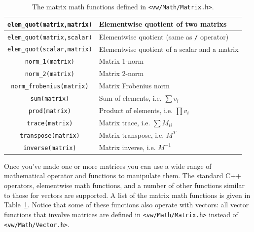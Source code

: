 \begin{table}[t!]
\begin{centering}
\begin{tabular}{|c|l|}
\verb#elem_quot(matrix,matrix)# & Elementwise quotient of two matrixs \\ \hline
\verb#elem_quot(matrix,scalar)# & Elementwise quotient (same as \verb#/# operator) \\ \hline
\verb#elem_quot(scalar,matrix)# & Elementwise quotient of a scalar and a matrix \\ \hline
\hline
\verb#norm_1(matrix)# & Matrix 1-norm \\ \hline
\verb#norm_2(matrix)# & Matrix 2-norm \\ \hline
\verb#norm_frobenius(matrix)# & Matrix Frobenius norm \\ \hline
\verb#sum(matrix)# & Sum of elements, i.e. $\sum v_i$ \\ \hline
\verb#prod(matrix)# & Product of elements, i.e. $\prod v_i$ \\ \hline
\verb#trace(matrix)# & Matrix trace, i.e. $\sum M_{ii}$ \\ \hline
\verb#transpose(matrix)# & Matrix transpose, i.e. $M^T$ \\ \hline
\verb#inverse(matrix)# & Matrix inverse, i.e. $M^{-1}$ \\ \hline
\end{tabular}
\caption{The matrix math functions defined in {\tt <vw/Math/Matrix.h>}.}
\label{tbl:matrix-functions}
\end{centering}\end{table}

Once you've made one or more matrices you can use a wide range of 
mathematical operator and functions to manipulate them.  The 
standard C++ operators, elementwise math functions, and a number 
of other functions similar to those for vectors are supported.  A 
list of the matrix math functions is given in Table~\ref{tbl:matrix-functions}.
Notice that some of these functions also operate with vectors: 
all vector functions that involve matrices are defined in 
\verb#<vw/Math/Matrix.h># instead of \verb#<vw/Math/Vector.h>#.

